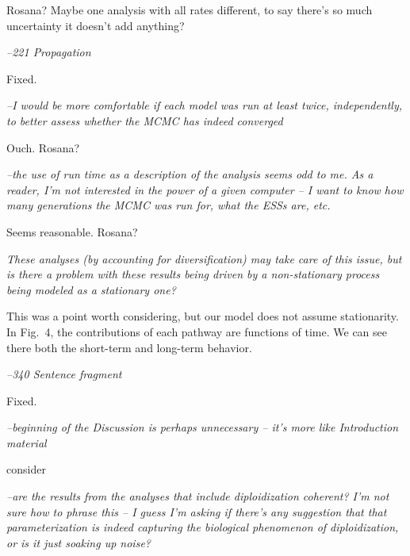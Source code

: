 \documentclass[11pt]{article}
\renewenvironment{quote}{\bigskip\noindent\itshape\ignorespaces}{\smallskip}
\begin{document}
Rosana?  Maybe one analysis with all rates different, to say there's so much uncertainty it doesn't add anything? %

\begin{quote}
--221  Propagation
\end{quote}

Fixed.

\begin{quote}
--I would be more comfortable if each model was run at least twice, independently, to better assess whether the MCMC has indeed converged
\end{quote}

Ouch.  Rosana? %

\begin{quote}
--the use of run time as a description of the analysis seems odd to me.
As a reader, I'm not interested in the power of a given computer -- I want to know how many generations the MCMC was run for, what the ESSs are, etc.
\end{quote}

Seems reasonable.  Rosana? %

\begin{quote}
-325  These analyses (by accounting for diversification) may take care of this issue, but is there a problem with these results being driven by a non-stationary process being modeled as a stationary one?
\end{quote}

This was a point worth considering, but our model does not assume stationarity.
In Fig.~4, the contributions of each pathway are functions of time.
We can see there both the short-term and long-term behavior.

\begin{quote}
--340  Sentence fragment
\end{quote}

Fixed. %

\begin{quote}
--beginning of the Discussion is perhaps unnecessary -- it's more like Introduction material
\end{quote}

consider %

\begin{quote}
--are the results from the analyses that include diploidization coherent?
I'm not sure how to phrase this -- I guess I'm asking if there's any suggestion that that parameterization is indeed capturing the biological phenomenon of diploidization, or is it just soaking up noise?
\end{quote}
\end{document}
